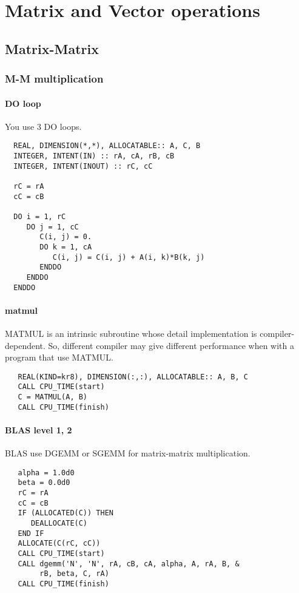 
\chapter{Matrix and Vector operations}
\label{chap:matr-vect-oper}

\section{Matrix-Matrix}
\label{sec:matrix-matrix}

\subsection{M-M multiplication}
\label{sec:m-m-multiplication}

\subsubsection{DO loop}
\label{sec:do-loop}

You use 3 DO loops.

\begin{lstlisting}
  REAL, DIMENSION(*,*), ALLOCATABLE:: A, C, B
  INTEGER, INTENT(IN) :: rA, cA, rB, cB
  INTEGER, INTENT(INOUT) :: rC, cC

  rC = rA
  cC = cB
  
  DO i = 1, rC
     DO j = 1, cC
        C(i, j) = 0.
        DO k = 1, cA
           C(i, j) = C(i, j) + A(i, k)*B(k, j)
        ENDDO
     ENDDO
  ENDDO
\end{lstlisting}

\subsubsection{matmul }
\label{sec:matmul-}

MATMUL is an intrinsic subroutine whose detail implementation is
compiler-dependent. So, different compiler may give different
performance when with a program that use MATMUL.

\begin{lstlisting}
   REAL(KIND=kr8), DIMENSION(:,:), ALLOCATABLE:: A, B, C
   CALL CPU_TIME(start)
   C = MATMUL(A, B)
   CALL CPU_TIME(finish)
\end{lstlisting}
\subsubsection{BLAS level 1, 2}
\label{sec:blas-level-1}

BLAS use DGEMM or SGEMM for matrix-matrix multiplication. 
\begin{lstlisting}
   alpha = 1.0d0
   beta = 0.0d0
   rC = rA
   cC = cB
   IF (ALLOCATED(C)) THEN
      DEALLOCATE(C)
   END IF
   ALLOCATE(C(rC, cC))
   CALL CPU_TIME(start)
   CALL dgemm('N', 'N', rA, cB, cA, alpha, A, rA, B, &
        rB, beta, C, rA)
   CALL CPU_TIME(finish)
\end{lstlisting}


